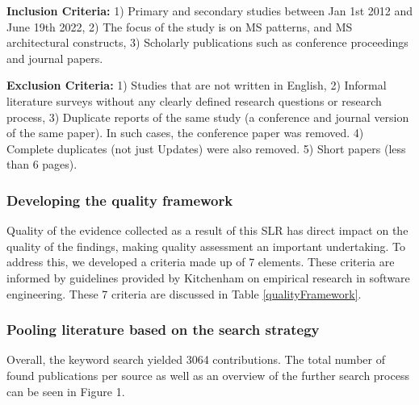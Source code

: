 \documentclass{bmcart}
\begin{document}
\textbf{Inclusion Criteria:} 1) Primary and secondary studies between Jan 1st 2012 and June 19th 2022, 2) The focus of the study is on MS patterns, and MS architectural constructs, 3) Scholarly publications such as conference proceedings and journal papers.

\textbf{Exclusion Criteria:} 1) Studies that are not written in English, 2) Informal literature surveys without any clearly defined research questions or research process, 3) Duplicate reports of the same study (a conference and journal version of the same paper). In such cases, the conference paper was removed. 4) Complete duplicates (not just Updates) were also removed. 5) Short papers (less than 6 pages).

\subsubsection{Developing the quality framework}

Quality of the evidence collected as a result of this SLR has direct impact on the quality of the findings, making quality assessment an important undertaking. To address this, we developed a criteria made up of 7 elements. These criteria are informed by guidelines provided by Kitchenham \cite{Kitchenham.2004} on empirical research in software engineering. These 7 criteria are discussed in Table \ref{qualityFramework}.


\subsubsection{Pooling literature based on the search strategy}
Overall, the keyword search yielded 3064 contributions. The total number of found publications per source as well as an overview of the further search process can be seen in Figure 1.
\end{document}
